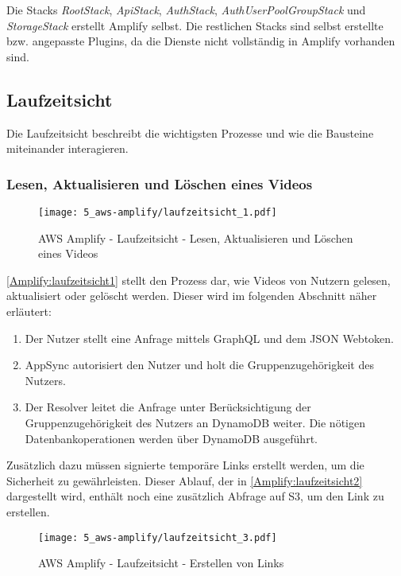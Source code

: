 Die Stacks \textit{RootStack}, \textit{ApiStack}, \textit{AuthStack}, \textit{AuthUserPoolGroupStack} und \textit{StorageStack} erstellt Amplify selbst. Die restlichen Stacks sind selbst erstellte bzw. angepasste Plugins, da die Dienste nicht vollständig in Amplify vorhanden sind.

\subsection{Laufzeitsicht}

Die Laufzeitsicht beschreibt die wichtigsten Prozesse und wie die Bausteine miteinander interagieren.

\subsubsection{Lesen, Aktualisieren und Löschen eines Videos}

\begin{figure}
  \centering
  \texttt{[image: 5\_aws-amplify/laufzeitsicht\_1.pdf]}
  \caption{AWS Amplify - Laufzeitsicht - Lesen, Aktualisieren und Löschen eines Videos}
  \label{Amplify:laufzeitsicht1}
\end{figure}

\autoref{Amplify:laufzeitsicht1} stellt den Prozess dar, wie Videos von Nutzern gelesen, aktualisiert oder gelöscht werden. Dieser wird im folgenden Abschnitt näher erläutert:
\begin{enumerate}
  \item{Der Nutzer stellt eine Anfrage mittels GraphQL und dem JSON Webtoken.}
  \item{AppSync autorisiert den Nutzer und holt die Gruppenzugehörigkeit des Nutzers.}
  \item{Der Resolver leitet die Anfrage unter Berücksichtigung der Gruppenzugehörigkeit des Nutzers an DynamoDB weiter. Die nötigen Datenbankoperationen werden über DynamoDB ausgeführt.}
\end{enumerate}

Zusätzlich dazu müssen signierte temporäre Links erstellt werden, um die Sicherheit zu gewährleisten. Dieser Ablauf, der in \autoref{Amplify:laufzeitsicht2} dargestellt wird, enthält noch eine zusätzlich Abfrage auf S3, um den Link zu erstellen.

\begin{figure}
  \centering
  \texttt{[image: 5\_aws-amplify/laufzeitsicht\_3.pdf]}
  \caption{AWS Amplify - Laufzeitsicht - Erstellen von Links}
  \label{Amplify:laufzeitsicht2}
\end{figure}

